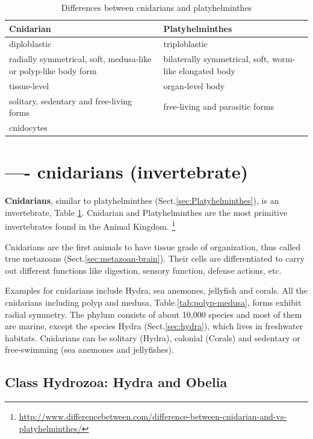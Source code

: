\begin{table}[hbt]
\begin{center}
    \begin{tabular}{p{5cm}l}
        \hline
        {\bf Cnidarian} & {\bf Platyhelminthes} \\
        \hline \hline
   diploblastic & triploblastic \\
   radially symmetrical, soft, medusa-like or polyp-like body form & bilaterally
   symmetrical, soft, worm-like elongated body \\
   tissue-level & organ-level body \\
    solitary, sedentary and free-living forms & free-living and parasitic forms
    \\
    cnidocytes &     
    \end{tabular}
\end{center}
\caption{Differences between cnidarians and platyhelminthes}
\label{tab:cnidarian-platyhelminthes}
\end{table}

\section{---- cnidarians (invertebrate)}
\label{sec:cnidarians}

{\bf Cnidarians}, similar to platyhelminthes (Sect.\ref{sec:Platyhelminthes}),
is an invertebrate, Table \ref{tab:cnidarian-platyhelminthes}.  
Cnidarian and Platyhelminthes are the most primitive invertebrates found in the
Animal Kingdom.
\footnote{\url{http://www.differencebetween.com/difference-between-cnidarian-and-vs-platyhelminthes/}}

Cnidarians are the first animals to have tissue grade of organization, thus
called true metazoans (Sect.\ref{sec:metazoan-brain}).
Their cells are differentiated to carry out different functions like digestion,
sensory function, defense actions, etc. 

Examples for cnidarians include Hydra, sea anemones, jellyfish and corals.
All the cnidarians including polyp and medusa, Table.\ref{tab:polyp-medusa},
forms exhibit radial symmetry. The phylum consists of about 10,000 species and
most of them are marine, except the species Hydra (Sect.\ref{sec:hydra}), which
lives in freshwater habitats. Cnidarians can be solitary (Hydra), colonial
(Corals) and sedentary or free-swimming (sea anemones and jellyfishes).

\subsection{Class Hydrozoa: Hydra and Obelia}
\label{sec:Class-Hydrozoa}


